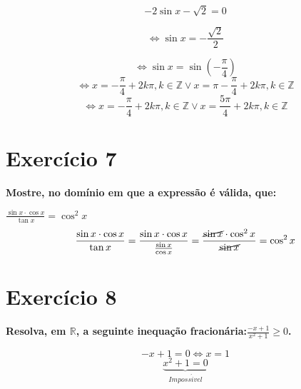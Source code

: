 \documentclass{article}
\begin{document}
\[-2\sin{x} -\sqrt{2} = 0\]

\[\Leftrightarrow \sin{x}=-\frac{\sqrt{2}}{2}\]

\[\Leftrightarrow \sin{x}=\sin(-\frac{\pi}{4})\]
\[\Leftrightarrow x=-\frac{\pi}{4} + 2k\pi, k \in \mathbb{Z} \lor x=\pi-\frac{\pi}{4} + 2k\pi, k \in \mathbb{Z} \]
\[\Leftrightarrow x=-\frac{\pi}{4}+ 2k\pi, k \in \mathbb{Z} \lor x=\frac{5\pi}{4}+ 2k\pi, k \in \mathbb{Z} \]

\section*{Exercício 7}\textbf{Mostre, no domínio em que a expressão é válida, que:}

\textbf{$\frac{\sin{x}\cdot \cos{x}}{\tan{x}} = \cos^2{x}$}
\[\frac{\sin{x}\cdot \cos{x}}{\tan{x}} = \frac{\sin{x}\cdot \cos{x}}{\frac{\sin{x}}{\cos{x}}}=\frac{\cancel{\sin{x}}\cdot \cos^2{x}}{\cancel{\sin{x}}}=\cos^2{x}\]

\section*{Exercício 8}\textbf{Resolva, em $\mathbb{R}$, a seguinte inequação fracionária:$\frac{-x + 1}{x^2+1}\geq 0$.}


	\[-x+1=0 \Leftrightarrow x = 1\]
	\[\underbrace{x^2+1=0}_{Imposs\acute{i}vel}\]
\end{document}
